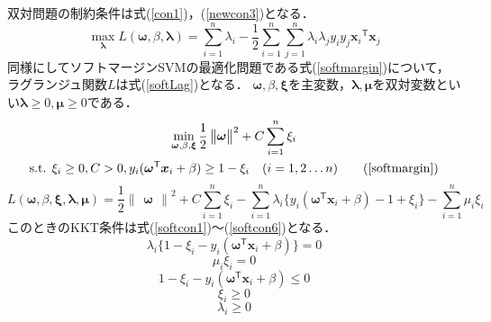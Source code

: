 \documentclass[11pt,a4paper,titlepage]{ltjsarticle}
\begin{document}
双対問題の制約条件は式(\ref{con1})，(\ref{newcon3})となる．
\begin{equation}
    \label{hard-dual}
    \max_{\bm{\lambda}}L(\bm{\omega},\beta,\bm{\lambda}) = \sum_{i=1}^{n}\lambda_i - \frac{1}{2}\sum_{i=1}^{n}\sum_{j=1}^{n}\lambda_i\lambda_jy_iy_j{\bm{x}_i}^\mathsf{T}\bm{x}_j
\end{equation}
\clearpage
同様にしてソフトマージンSVMの最適化問題である式(\ref{softmargin})について，ラグランジュ関数$L$は式(\ref{softLag})となる．
$\bm{\omega},\beta,\bm{\xi}$を主変数，$\bm{\lambda},\bm{\mu}$を双対変数といい$\bm{\lambda}\geq0,\bm{\mu}\geq0$である．
\begin{equation}
    \begin{gathered}
        \min_{\bm{\omega},\beta,\bm{\xi}}\frac{1}{2}\begin{Vmatrix}\bm{\omega}\end{Vmatrix}^2 + C\sum_{i=1}^{n}\xi_i\\
        \text{s.t. } \xi_i\geq0,C > 0, y_i(\bm{\omega}^\mathsf{T}\bm{x}_i + \beta) \geq 1-\xi_i \quad  (i = 1,2\dots n) \tag{\ref{softmargin}}
    \end{gathered}
\end{equation}
\begin{equation}
    \label{softLag}
    L(\bm{\omega},\beta,\bm{\xi},\bm{\lambda},\bm{\mu}) = \frac{1}{2}\begin{Vmatrix}\bm{\omega}\end{Vmatrix}^2 + C\sum_{i=1}^{n}\xi_i - \sum_{i=1}^{n}\lambda_i\{y_i(\bm{\omega}^\mathsf{T}\bm{x}_i + \beta) - 1+\xi_i\}-\sum_{i=1}^{n}\mu_i\xi_i
\end{equation}
このときのKKT条件は式(\ref{softcon1})～(\ref{softcon6})となる．
\begin{equation}
    \label{softcon1}
    \lambda_i\{1-\xi_i-y_i(\bm{\omega}^\mathsf{T}\bm{x}_i+\beta)\} = 0 
\end{equation}
\begin{equation}
    \label{softcon2}
    \mu_i\xi_i = 0
\end{equation}
\begin{equation}
    \label{softcon3}
    1-\xi_i-y_i(\bm{\omega}^\mathsf{T}\bm{x}_i+\beta) \leq 0
\end{equation}
\begin{equation}
    \label{softcon4}
    \xi_i \geq 0
\end{equation}
\begin{equation}
    \label{softcon5}
    \lambda_i\geq0
\end{equation}
\end{document}
